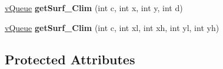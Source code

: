 \begin{DoxyCompactItemize}
\item 
\hyperlink{classev_1_1vQueue}{v\+Queue} {\bfseries get\+Surf\+\_\+\+Clim} (int c, int x, int y, int d)\hypertarget{classev_1_1vSurface2_a708416f0ae3b13858f1c96e203898223}{}\label{classev_1_1vSurface2_a708416f0ae3b13858f1c96e203898223}

\item 
\hyperlink{classev_1_1vQueue}{v\+Queue} {\bfseries get\+Surf\+\_\+\+Clim} (int c, int xl, int xh, int yl, int yh)\hypertarget{classev_1_1vSurface2_a1b04ff8d8d449b054a514c092bac1145}{}\label{classev_1_1vSurface2_a1b04ff8d8d449b054a514c092bac1145}

\end{DoxyCompactItemize}
\subsection*{Protected Attributes}
